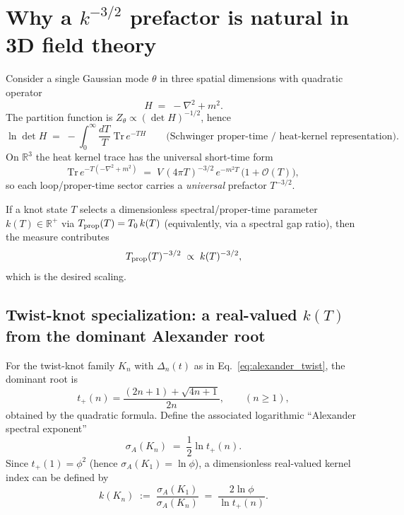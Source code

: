 \documentclass[11pt,a4paper]{article}
\begin{document}
    \section*{Why a $k^{-3/2}$ prefactor is natural in 3D field theory}

        Consider a single Gaussian mode $\theta$ in three spatial dimensions with quadratic operator
        \[
            H \;=\; -\nabla^2 + m^2.
        \]
        The partition function is $Z_\theta \propto (\det H)^{-1/2}$, hence
        \[
            \ln \det H \;=\; -\int_{0}^{\infty}\frac{dT}{T}\;\mathrm{Tr}\,e^{-T H}
            \qquad\text{(Schwinger proper-time / heat-kernel representation).}
        \]
        On $\mathbb{R}^3$ the heat kernel trace has the universal short-time form
        \[
            \mathrm{Tr}\,e^{-T(-\nabla^2+m^2)}
            \;=\;
            V\,(4\pi T)^{-3/2}\,e^{-m^2T}\,\big(1+\mathcal O(T)\big),
        \]
        so each loop/proper-time sector carries a \emph{universal} prefactor $T^{-3/2}$.

        If a knot state $T$ selects a dimensionless spectral/proper-time parameter $k(T)\in\mathbb{R}^+$
        via $T_{\rm prop}(T)=T_0\,k(T)$ (equivalently, via a spectral gap ratio),
        then the measure contributes
        \[
            T_{\rm prop}(T)^{-3/2}\;\propto\;k(T)^{-3/2},
        \]
        which is the desired scaling.

        \subsection*{Twist-knot specialization: a real-valued $k(T)$ from the dominant Alexander root}

        For the twist-knot family $K_n$ with $\Delta_n(t)$ as in Eq.~\eqref{eq:alexander_twist},
        the dominant root is
        \begin{equation}
            t_+(n)
            =
            \frac{(2n+1)+\sqrt{4n+1}}{2n},
            \qquad (n\ge 1),
            \label{eq:tpn}
        \end{equation}
        obtained by the quadratic formula.
        Define the associated logarithmic ``Alexander spectral exponent''
        \begin{equation}
            \sigma_A(K_n) \;=\; \frac12 \ln t_+(n).
            \label{eq:sigmaA}
        \end{equation}
        Since $t_+(1)=\phi^2$ (hence $\sigma_A(K_1)=\ln\phi$), a dimensionless real-valued kernel index can be defined by
        \begin{equation}
            k(K_n)
            \;:=\;
            \frac{\sigma_A(K_1)}{\sigma_A(K_n)}
            \;=\;
            \frac{2\ln\phi}{\ln t_+(n)}.
            \label{eq:k_alex_twist}
        \end{equation}
\end{document}
